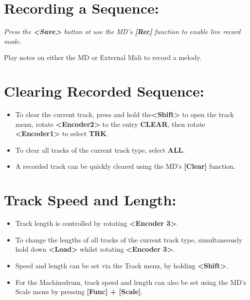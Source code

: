 \section{Recording a Sequence:}
\textit{Press the \textbf{<Save>} button ot use the MD's \textbf{[Rec]} function to enable live record mode.\\}

Play notes on either the MD or External Midi to record a melody.

\section{Clearing Recorded Sequence:}
\begin{itemize}
\item To clear the current track, press and hold the\textbf{<Shift>} to open the track menu, rotate \textbf{<Encoder2>} to the entry \textbf{CLEAR}, then rotate \textbf{<Encoder1>} to select \textbf{TRK}.
\item To clear all tracks of the current track type, select \textbf{ALL}.
\item A recorded track can be quickly cleared using the MD's \textbf{[Clear]} function.
\end{itemize}

\section{Track Speed and Length:}
\begin{itemize}
\item Track length is controlled by rotating \textbf{<Encoder 3>}.
\item To change the lengths of all tracks of the current track type, simultaneously hold down \textbf{<Load>} whilst rotating \textbf{<Encoder 3>}.
\item Speed and length can be set via the Track menu, by holding \textbf{<Shift>}.
\item For the Machinedrum, track speed and length can also be set using the MD's Scale menu by pressing \textbf{[Func] + [Scale]}.
\end{itemize}